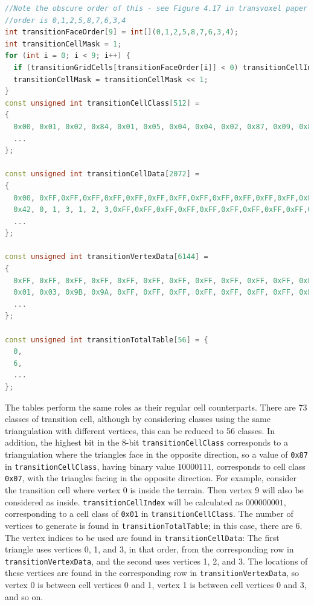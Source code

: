 \documentclass[11pt]{article}
\begin{document}
\begin{lstlisting}[language=C++, label={tv_transition_tables}, caption={Calculation of \texttt{transitionCellIndex}, and lookup tables for transition cells. An example of their usage is given below.}]
//Note the obscure order of this - see Figure 4.17 in transvoxel paper
//order is 0,1,2,5,8,7,6,3,4
int transitionFaceOrder[9] = int[](0,1,2,5,8,7,6,3,4);
int transitionCellMask = 1;
for (int i = 0; i < 9; i++) {
  if (transitionGridCells[transitionFaceOrder[i]] < 0) transitionCellIndex |= transitionCellMask;
  transitionCellMask = transitionCellMask << 1;
}
const unsigned int transitionCellClass[512] =
{
  0x00, 0x01, 0x02, 0x84, 0x01, 0x05, 0x04, 0x04, 0x02, 0x87, 0x09, 0x8C, 0x84, 0x0B, 0x05, 0x05,
  ...
};

const unsigned int transitionCellData[2072] =
{
  0x00, 0xFF,0xFF,0xFF,0xFF,0xFF,0xFF,0xFF,0xFF,0xFF,0xFF,0xFF,0xFF,0xFF,0xFF,0xFF,0xFF,0xFF,0xFF,0xFF,0xFF,0xFF,0xFF,0xFF,0xFF,0xFF,0xFF,0xFF,0xFF,0xFF,0xFF,0xFF,0xFF,0xFF,0xFF,0xFF,0xFF,
  0x42, 0, 1, 3, 1, 2, 3,0xFF,0xFF,0xFF,0xFF,0xFF,0xFF,0xFF,0xFF,0xFF,0xFF,0xFF,0xFF,0xFF,0xFF,0xFF,0xFF,0xFF,0xFF,0xFF,0xFF,0xFF,0xFF,0xFF,0xFF,0xFF,0xFF,0xFF,0xFF,0xFF,0xFF,
  ...
};

const unsigned int transitionVertexData[6144] =
{
  0xFF, 0xFF, 0xFF, 0xFF, 0xFF, 0xFF, 0xFF, 0xFF, 0xFF, 0xFF, 0xFF, 0xFF,
  0x01, 0x03, 0x9B, 0x9A, 0xFF, 0xFF, 0xFF, 0xFF, 0xFF, 0xFF, 0xFF, 0xFF,
  ...
};

const unsigned int transitionTotalTable[56] = {
  0,
  6,
  ...
};       
\end{lstlisting}

The tables perform the same roles as their regular cell counterparts. There are 73 classes of transition cell, although by considering classes using the same triangulation with different vertices, this can be reduced to 56 classes. In addition, the highest bit in the 8-bit \texttt{transitionCellClass} corresponds to a triangulation where the triangles face in the opposite direction, so a value of \texttt{0x87} in \texttt{transitionCellClass}, having binary value $10000111$, corresponds to cell class \texttt{0x07}, with the triangles facing in the opposite direction. 
For example, consider the transition cell where vertex 0 is inside the terrain. Then vertex 9 will also be considered as inside. \texttt{transitionCellIndex} will be calculated as $000000001$, corresponding to a cell class of \texttt{0x01} in \texttt{transitionCellClass}. 
The number of vertices to generate is found in \texttt{transitionTotalTable}; in this case, there are 6. The vertex indices to be used are found in \texttt{transitionCellData}: The first triangle uses vertices 0, 1, and 3, in that order, from the corresponding row in \texttt{transitionVertexData}, and the second uses vertices 1, 2, and 3.
The locations of these vertices are found in the corresponding row in \texttt{transitionVertexData}, so vertex 0 is between cell vertices 0 and 1, vertex 1 is between cell vertices 0 and 3, and so on.
\end{document}
